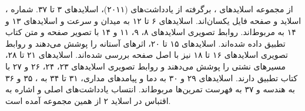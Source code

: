 ، از مجموعه اسلایدهای ،
برگرفته از یادداشت‌های  (۲۰۱۱)، اسلایدهای ۳ تا ۳۷. شماره اسلاید و صفحه فایل
یکسان‌اند. اسلایدهای ۶ تا ۱۲ به میدان و سرعت و اسلایدهای ۱۳ و ۱۴ به
 مربوط‌اند. روابط تصویری اسلایدهای ۸، ۹، ۱۱
و ۱۴ با تصویر صفحه و متن کتاب تطبیق داده شده‌اند. اسلایدهای ۱۵ تا ۲۰،
اثرهای آستانه را پوشش می‌دهند و روابط تصویری اسلایدهای ۱۶ تا ۱۸ نیز
با اصل صفحه بررسی شده‌اند. اسلایدهای ۲۱ تا ۲۸، مسیرهای نشتی را پوشش
می‌دهند و روابط تصویری اسلایدهای ۲۳، ۲۴، ۲۶ و ۲۷ با کتاب تطبیق دارند.
اسلایدهای ۲۹ و ۳۰ به دما و پیامدهای مداری، ۳۱ تا ۳۴ به
، ۳۵ و ۳۶ به هندسه و ۳۷ به فهرست تمرین‌ها مربوط‌اند.
انتساب یادداشت‌های اصلی و اشاره به اقتباس در اسلاید ۲  از همین مجموعه آمده است.
